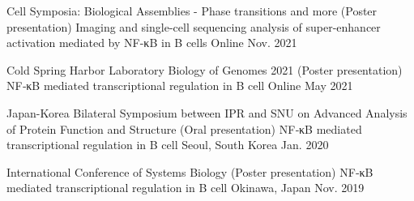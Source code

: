 



\begin{cventries}

  \cventrypub
    {Cell Symposia: Biological Assemblies - Phase transitions and more (Poster presentation)} %
    {Imaging and single-cell sequencing analysis of super-enhancer activation mediated by NF-κB in B cells} %
    {Online} %
    {Nov. 2021} %

  \cventrypub
    {Cold Spring Harbor Laboratory Biology of Genomes 2021 (Poster presentation)} %
    {NF‑κB mediated transcriptional regulation in B cell} %
    {Online} %
    {May 2021} %

  \cventrypub
    {Japan-Korea Bilateral Symposium between IPR and SNU on Advanced Analysis of Protein Function and Structure (Oral presentation)} %
    {NF‑κB mediated transcriptional regulation in B cell} %
    {Seoul, South Korea} %
    {Jan. 2020} %

  \cventrypublast
    {International Conference of Systems Biology (Poster presentation)} %
    {NF‑κB mediated transcriptional regulation in B cell} %
    {Okinawa, Japan} %
    {Nov. 2019} %
  

\end{cventries}



